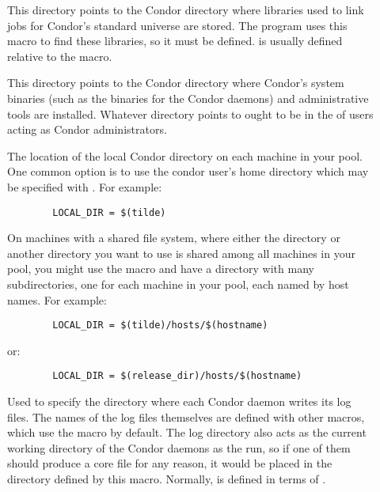 \begin{description}
\item[] \label{param:Lib} This directory points to the
  Condor directory where libraries used to link jobs for Condor's
  standard universe are stored.  The  program uses
  this macro to find these libraries, so it must be defined.
   is usually defined relative to the
   macro.

\item[] \label{param:Sbin} This directory points to the
  Condor directory where Condor's system binaries (such as the
  binaries for the Condor daemons) and administrative tools are
  installed.  Whatever directory  points to ought
  to be in the  of users acting as Condor
  administrators.

\item[] \label{param:LocalDir} The location of the
  local Condor directory on each machine in your pool.  One common
  option is to use the condor user's home directory which may be
  specified with .  For example:
\begin{verbatim}
        LOCAL_DIR = $(tilde)
\end{verbatim}
  
  On machines with a shared file system, where either the
   directory or another directory you want to use is
  shared among all machines in your pool, you might use the
   macro and have a directory with many
  subdirectories, one for each machine in your pool, each named by
  host names.  For example:
\begin{verbatim}
        LOCAL_DIR = $(tilde)/hosts/$(hostname)      
\end{verbatim}
  or:
\begin{verbatim}
        LOCAL_DIR = $(release_dir)/hosts/$(hostname)
\end{verbatim}
  
\item[] \label{param:Log} Used to specify the
  directory where each Condor daemon writes its log files.  The names
  of the log files themselves are defined with other macros, which use
  the  macro by default.  The log directory also acts as
  the current working directory of the Condor daemons as the run, so
  if one of them should produce a core file for any reason, it would
  be placed
  in the directory defined by this macro.  Normally,  is
  defined in terms of .
  

\end{description}
